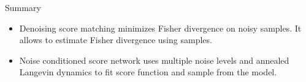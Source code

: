 \begin{frame}{Summary}
	\begin{itemize}
		\item Denoising score matching minimizes Fisher divergence on noisy samples. It allows to estimate Fisher divergence using samples.
		\vfill
		\item Noise conditioned score network uses multiple noise levels and annealed Langevin dynamics to fit score function and sample from the model.
	\end{itemize}
\end{frame}
 